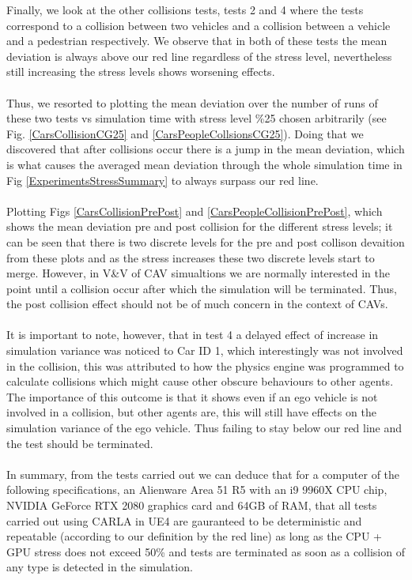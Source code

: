 \noindent Finally, we look at the other collisions tests, tests 2 and 4 where the tests correspond to a collision between two vehicles and a collision between a vehicle and a pedestrian respectively. 
We observe that in both of these tests the mean deviation is always above our red line regardless of the stress level, nevertheless still increasing the stress levels shows worsening effects. \\\\
\noindent Thus, we resorted to plotting the mean deviation over the number of runs of these two tests vs simulation time with stress level \%25 chosen arbitrarily (see Fig. \ref{CarsCollisionCG25} and \ref{CarsPeopleCollsionsCG25}). 
Doing that we discovered that after collisions occur there is a jump in the mean deviation, which is what causes the averaged mean deviation through the whole simulation time in Fig \ref{ExperimentsStressSummary} to always surpass our red line.\\\\
\noindent Plotting Figs \ref{CarsCollisionPrePost} and \ref{CarsPeopleCollisionPrePost}, which shows the mean deviation pre and post collision for the different stress levels; it can be seen that there is two discrete levels for the pre and post collison devaition from these plots and as the stress increases these two discrete levels start to merge. 
However, in V\&V of CAV simualtions we  are normally interested in the point until a collision occur after which the simulation will be terminated. Thus, the post collision effect should not be of much concern in the context of CAVs.\\\\
\noindent It is important to note, however, that in test 4 a delayed effect of increase in simulation variance was noticed to Car ID 1, which interestingly was not involved in the collision, this was attributed to how the physics engine was programmed to calculate collisions which might cause other obscure behaviours to other agents. The importance of this outcome is that it shows even if an ego vehicle is not involved in a collision, but other agents are, this will still have effects on the simulation variance of the ego vehicle. Thus failing to stay below our red line and the test should be terminated.\\\\
\noindent In summary, from the tests carried out we can deduce that for a computer of the following specifications, an Alienware Area 51 R5 with an i9 9960X CPU chip, NVIDIA GeForce RTX 2080 graphics card and 64GB of RAM, that all tests carried out using CARLA in UE4 are gauranteed to be deterministic and repeatable (according to our definition by the red line) as long as the CPU + GPU stress does not exceed 50\% and tests are terminated as soon as a collision of any type is detected in the simulation. 